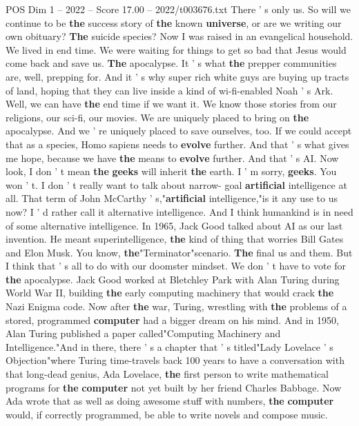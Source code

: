 \begin{textsample}{POS Dim 1 – 2022 – Score 17.00 – 2022/t003676.txt}
There ' s only us.
So will we continue to be \textbf{the} success story of \textbf{the} known \textbf{universe}, or are we writing our own obituary? \textbf{The} suicide species?
Now I was raised in an evangelical household.
We lived in end time.
We were waiting for things to get so bad that Jesus would come back and save us. \textbf{The} apocalypse.
It ' s what \textbf{the} prepper communities are, well, prepping for.
And it ' s why super rich white guys are buying up tracts of land, hoping that they can live inside a kind of wi-fi-enabled Noah ' s Ark.
Well, we can have \textbf{the} end time if we want it.
We know those stories from our religions, our sci-fi, our movies.
We are uniquely placed to bring on \textbf{the} apocalypse.
And we ' re uniquely placed to save ourselves, too.
If we could accept that as a species, Homo sapiens needs to \textbf{evolve} further.
And that ' s what gives me hope, because we have \textbf{the} means to \textbf{evolve} further.
And that ' s AI.
Now look, I don ' t mean \textbf{the} \textbf{geeks} will inherit \textbf{the} earth.
I ' m sorry, \textbf{geeks}.
You won ' t.
I don ' t really want to talk about narrow- goal \textbf{artificial} intelligence at all.
That term of John McCarthy ' s,"\textbf{artificial} intelligence,"is it any use to us now?
I ' d rather call it alternative intelligence.
And I think humankind is in need of some alternative intelligence.
In 1965, Jack Good talked about AI as our last invention.
He meant superintelligence, \textbf{the} kind of thing that worries Bill Gates and Elon Musk.
You know, \textbf{the}"Terminator"scenario. \textbf{The} final us and them.
But I think that ' s all to do with our doomster mindset.
We don ' t have to vote for \textbf{the} apocalypse.
Jack Good worked at Bletchley Park with Alan Turing during World War II, building \textbf{the} early computing machinery that would crack \textbf{the} Nazi Enigma code.
Now after \textbf{the} war, Turing, wrestling with \textbf{the} problems of a stored, programmed \textbf{computer} had a bigger dream on his mind.
And in 1950, Alan Turing published a paper called"Computing Machinery and Intelligence."And in there, there ' s a chapter that ' s titled"Lady Lovelace ' s Objection"where Turing time-travels back 100 years to have a conversation with that long-dead genius, Ada Lovelace, \textbf{the} first person to write mathematical programs for \textbf{the} \textbf{computer} not yet built by her friend Charles Babbage.
Now Ada wrote that as well as doing awesome stuff with numbers, \textbf{the} \textbf{computer} would, if correctly programmed, be able to write novels and compose music.

\end{textsample}
